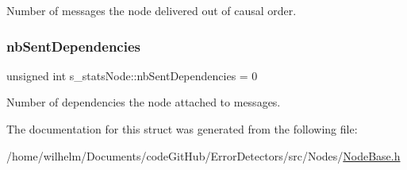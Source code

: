 Number of messages the node delivered out of causal order. 

\mbox{\label{structs__stats_node_af01c78389a27c9eeff8033f6b3d3beee}} 
\subsubsection{\texorpdfstring{nb\+Sent\+Dependencies}{nbSentDependencies}}
{\footnotesize\ttfamily unsigned int s\+\_\+stats\+Node\+::nb\+Sent\+Dependencies = 0}



Number of dependencies the node attached to messages. 



The documentation for this struct was generated from the following file\+:\begin{DoxyCompactItemize}
\item 
/home/wilhelm/\+Documents/code\+Git\+Hub/\+Error\+Detectors/src/\+Nodes/\hyperlink{_node_base_8h}{Node\+Base.\+h}\end{DoxyCompactItemize}
